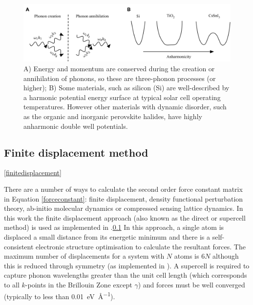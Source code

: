 \begin{figure}[h]
\centering
  \includegraphics[width=1.0\columnwidth]{figures/ch3/anharmonicity.png}
  \caption[3-phonon processes and anharmonic potential energy surfaces]{A) Energy and momentum are conserved during the creation or annihilation of phonons, so these are three-phonon processes (or higher); B) Some materials, such as silicon (Si) are well-described by a harmonic potential energy surface at typical solar cell operating temperatures. However other materials with dynamic disorder, such as the organic and inorganic perovskite halides, have highly anharmonic double well potentials.}
  \label{harmonicregime}
\end{figure}  %



\subsection{Finite displacement method} \ref{finitedisplacement}

There are a number of ways to calculate the second order force constant matrix in Equation \ref{forceconstant}: finite displacement, density functional perturbation theory, ab-initio molecular dynamics or compressed sensing lattice dynamics.
In this work the finite displacement approach (also known as the direct or supercell method) is used as implemented in .\ref{} 
In this approach, a single atom is displaced a small distance from its energetic minimum and there is a self-consistent electronic structure optimisation to calculate the resultant forces. The maximum number of displacements for a system with $N$ atoms is $6N$ although this is reduced through symmetry (as implemented in ). 
A supercell is required to capture phonon wavelengths greater than the unit cell length (which corresponds to all $k$-points in the Brillouin Zone except $\gamma$) and forces must be well converged (typically to less than \SI{0.01}{\electronvolt\per\angstrom}).

